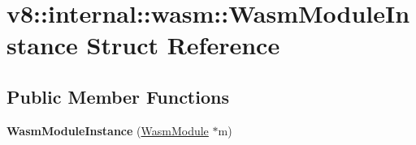 \hypertarget{structv8_1_1internal_1_1wasm_1_1_wasm_module_instance}{}\section{v8\+:\+:internal\+:\+:wasm\+:\+:Wasm\+Module\+Instance Struct Reference}
\label{structv8_1_1internal_1_1wasm_1_1_wasm_module_instance}
\subsection*{Public Member Functions}
\begin{DoxyCompactItemize}
\item 
{\bfseries Wasm\+Module\+Instance} (\hyperlink{structv8_1_1internal_1_1wasm_1_1_wasm_module}{Wasm\+Module} $\ast$m)\hypertarget{structv8_1_1internal_1_1wasm_1_1_wasm_module_instance_a99e691f5795bf97ff3fc2736a8209410}{}\label{structv8_1_1internal_1_1wasm_1_1_wasm_module_instance_a99e691f5795bf97ff3fc2736a8209410}

\end{DoxyCompactItemize}
